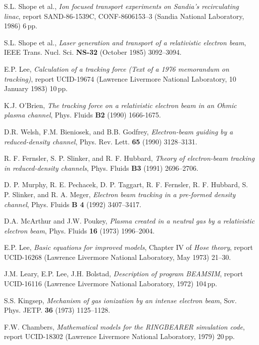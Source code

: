 \documentclass [12pt,a4paper,     ]{report} %
\begin{document}
\begin{enumerate}
 S.L. Shope et al., \emph{Ion focused transport experiments on Sandia's recirculating linac}, report SAND-86-1539C, CONF-8606153--3 (Sandia National Laboratory, 1986) 6\,pp.

 S.L. Shope et al., \emph{Laser generation and transport of a relativistic electron beam}, IEEE Trans. Nucl. Sci. {\bf NS-32} (October 1985) 3092--3094.

 E.P. Lee, \emph{Calculation of a tracking force (Text of a 1976 memorandum on tracking)},  report UCID-19674 (Lawrence Livermore National Laboratory, 10 January 1983) 10\,pp.

  K.J. O'Brien, \emph{The tracking force on a relativistic electron beam in an Ohmic plasma channel}, Phys. Fluids {\bf B2} (1990) 1666-1675.

 D.R. Welsh, F.M. Bieniosek, and B.B. Godfrey, \emph{Electron-beam guiding by a reduced-density channel}, Phys. Rev. Lett. {\bf 65} (1990) 3128--3131.

  R. F. Fernsler, S. P. Slinker, and R. F. Hubbard, \emph{Theory of electron-beam tracking in reduced-density channels}, Phys. Fluids {\bf B3} (1991) 2696--2706.

 D. P. Murphy, R. E. Pechacek, D. P. Taggart, R. F. Fernsler, R. F. Hubbard, S. P. Slinker, and R. A. Meger, \emph{Electron beam tracking in a pre-formed density channel}, Phys. Fluids {\bf B 4} (1992) 3407--3417. 



 D.A. McArthur and J.W. Poukey, \emph{Plasma created in a neutral gas by a relativistic electron beam}, Phys. Fluids {\bf 16} (1973) 1996--2004.

 E.P. Lee, \emph{Basic equations for improved models}, Chapter IV of \emph{Hose theory}, report UCID-16268 (Lawrence Livermore National Laboratory, May 1973) 21--30.

 J.M. Leary, E.P. Lee, J.H. Bolstad, \emph{Description of program BEAMSIM}, report UCID-16116 (Lawrence Livermore National Laboratory, 1972) 104\,pp.

 S.S. Kingsep, \emph{Mechanism of gas ionization by an intense electron beam}, Sov. Phys. JETP. {\bf 36} (1973) 1125--1128.

  F.W. Chambers, \emph{Mathematical models for the RINGBEARER simulation code}, report UCID-18302 (Lawrence Livermore National Laboratory, 1979) 20\,pp.


\end{enumerate}
\end{document}
